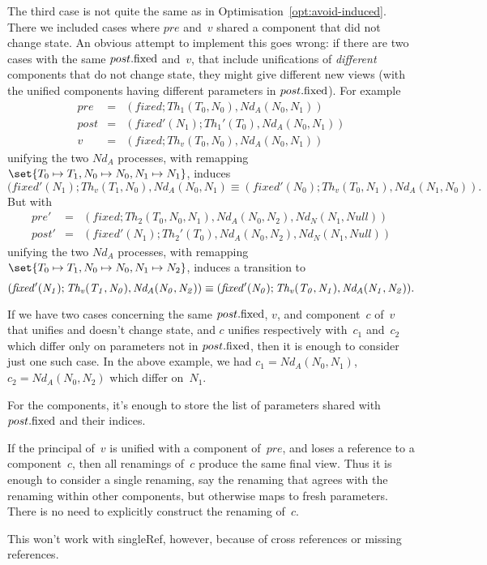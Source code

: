 \begin{improve}
The third case is not quite the same as in
Optimisation~\ref{opt:avoid-induced}.  There we included cases where $pre$
and~$v$ shared a component that did not change state.  An obvious attempt to
implement this goes wrong: if there are two cases with the same $post.\fixed$
and~$v$, that include unifications of \emph{different} components that do not
change state, they might give different new views (with the unified components
having different parameters in $post.\fixed$).
%
For example
\begin{eqnarray*}
pre & = & (fixed; Th_1(T_0,N_0), Nd_A(N_0,N_1)) \\
post & = & (fixed'(N_1); Th_1'(T_0), Nd_A(N_0,N_1)) \\
v & = & (fixed; Th_v(T_0,N_0), Nd_A(N_0,N_1))
\end{eqnarray*}
unifying the two $Nd_A$ processes, with remapping $\set{T_0 \mapsto T_1, N_0
  \mapsto N_0,\linebreak[1] {N_1 \mapsto N_1}}$, induces
\[
(fixed'(N_1); Th_v(T_1,N_0), Nd_A(N_0,N_1) \equiv
(fixed'(N_0); Th_v(T_0,N_1), Nd_A(N_1,N_0)).
\]
But with 
\begin{eqnarray*}
pre' & = & (fixed; Th_2(T_0,N_0,N_1), Nd_A(N_0,N_2), Nd_N(N_1,Null)) \\
post' & = & (fixed'(N_1); Th_2'(T_0), Nd_A(N_0,N_2), Nd_N(N_1,Null))
\end{eqnarray*}
unifying the two $Nd_A$ processes, with remapping $\set{T_0 \mapsto T_1, N_0
  \mapsto N_0,\linebreak[1] {N_1 \mapsto N_2}}$, induces a transition to
\[\mit
(fixed'(N_1); Th_v(T_1,N_0), Nd_A(N_0,N_2)) \equiv
  (fixed'(N_0); Th_v(T_0,N_1), Nd_A(N_1, N_2)).
\]


If we have two cases concerning the same $post.\fixed$, $v$, and component~$c$
of~$v$ that unifies and doesn't change state, and $c$ unifies respectively
with~$c_1$ and~$c_2$ which differ only on parameters not in $post.\fixed$,
then it is enough to consider just one such case.  In the above example, we
had $c_1 = Nd_A(N_0,N_1)$,\, $c_2 = Nd_A(N_0,N_2)$ which differ on~$N_1$. 

  For the components, it's enough to store the list of
parameters shared with $post.\fixed$ and their indices. 
\end{improve}

 

\begin{opt}
If the principal of~$v$ is unified with a component of~$pre$, and loses a
reference to a component~$c$, then all renamings of~$c$ produce the same final
view.  Thus it is enough to consider a single renaming, say the renaming that
agrees with the renaming within other components, but otherwise maps to fresh
parameters.  There is no need to explicitly construct the renaming of~$c$.  
%

This won't work with singleRef, however, because of cross references or
missing references. 
\end{opt}

